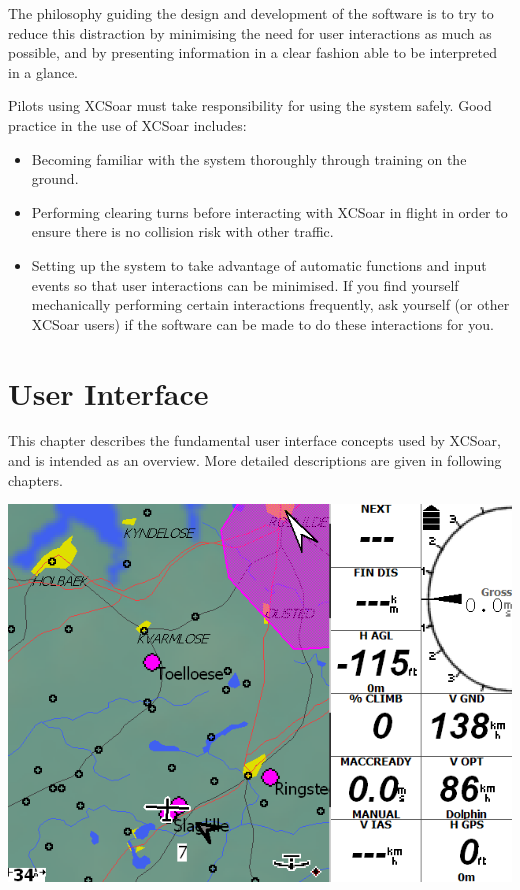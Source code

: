 \documentclass[a4paper,12pt]{refrep}
\begin{document}
The philosophy guiding the design and development of the software is
to try to reduce this distraction by minimising the need for user
interactions as much as possible, and by presenting information in a
clear fashion able to be interpreted in a glance.

Pilots using XCSoar must take responsibility for using the system safely.
Good practice in the use of XCSoar includes:
\begin{itemize}
\item Becoming familiar with the system thoroughly through training on 
  the ground.
\item Performing clearing turns before interacting with XCSoar in flight
  in order to ensure there is no collision risk with other traffic.
\item Setting up the system to take advantage of automatic functions
  and input events so that user interactions can be minimised.  If you
  find yourself mechanically performing certain interactions frequently,
  ask yourself (or other XCSoar users) if the software can be made to do 
  these interactions for you.
\end{itemize}


\chapter{User Interface}\label{cha:interface}
This chapter describes the fundamental user interface concepts used by
XCSoar, and is intended as an overview.  More detailed descriptions
are given in following chapters.

\begin{center}
\includegraphics[angle=0,width=\linewidth,keepaspectratio='true']{figures/plain.png}
\end{center}
\end{document}
